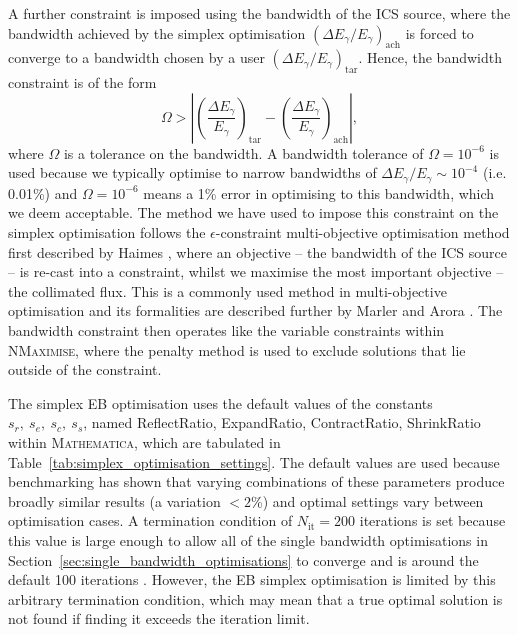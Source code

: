 \documentclass[../main.tex]{subfiles}
\begin{document}
A further constraint is imposed using the bandwidth of the ICS source, where the bandwidth achieved by the simplex optimisation $\left(\Delta E_{\gamma}/E_{\gamma}\right)_{\mathrm{ach}}$ is forced to converge to a bandwidth chosen by a user $\left(\Delta E_{\gamma}/E_{\gamma}\right)_{\mathrm{tar}}$. Hence, the bandwidth constraint is of the form
\begin{equation}
\Omega > \left|\left(\frac{\Delta E_{\gamma}}{E_{\gamma}}\right)_{\mathrm{tar}}-\left(\frac{\Delta E_{\gamma}}{E_{\gamma}}\right)_{\mathrm{ach}}\right|,    
\label{eq:simplex_epsilon_constraint}
\end{equation}
where $\Omega$ is a tolerance on the bandwidth. A bandwidth tolerance of $\Omega = 10^{-6}$ is used because we typically optimise to narrow bandwidths of $\Delta E_{\gamma}/E_{\gamma} \sim 10^{-4}$ (i.e. 0.01\%)  and $\Omega = 10^{-6}$ means a 1\% error in optimising to this bandwidth, which we deem acceptable. The method we have used to impose this constraint on the simplex optimisation follows the $\epsilon$-constraint multi-objective optimisation method first described by Haimes \cite{haimes1971modeling}, where an objective -- the bandwidth of the ICS source -- is re-cast into a constraint, whilst we maximise the most important objective  -- the collimated flux. This is a commonly used method in multi-objective optimisation and its formalities are described further by Marler and Arora \cite{marler2004survey}. The bandwidth constraint then operates like the variable constraints within \textsc{NMaximise}, where the penalty method is used to exclude solutions that lie outside of the constraint.

The simplex EB optimisation uses the default values of the constants $s_{r},~s_{e}, ~s_{c},~s_{s}$, named ReflectRatio, ExpandRatio, ContractRatio, ShrinkRatio within \textsc{Mathematica}, which are tabulated in Table~\ref{tab:simplex_optimisation_settings}. The default values are used because benchmarking has shown that varying combinations of these parameters produce broadly similar results (a variation $ < 2$\%) and optimal settings vary between optimisation cases. A termination condition of $N_{\mathrm{it}} = 200$ iterations is set because this value is large enough to allow all of the single bandwidth optimisations in Section~\ref{sec:single_bandwidth_optimisations} to converge and is around the default 100 iterations \cite{wolfram2021nmaximize}. However, the EB simplex optimisation is limited by this arbitrary termination condition, which may mean that a true optimal solution is not found if finding it exceeds the iteration limit.
\end{document}
